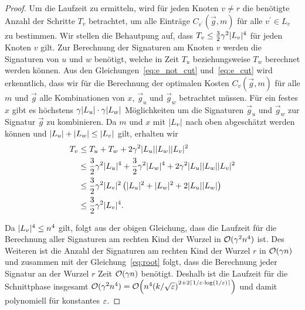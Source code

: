 \begin{proof}
    Um die Laufzeit zu ermitteln, wird für jeden Knoten $v \neq r$ die benötigte Anzahl der Schritte $T_v$ betrachtet, um alle Einträge $C_{v^\prime}(\vec{g}, m)$ für alle $v^\prime \in L_v$ zu bestimmen. 
    Wir stellen die Behautpung auf, dass $T_v \leq \frac{3}{2} \gamma^2 \lvert L_v\rvert^4$ für jeden Knoten $v$ gilt.
    Zur Berechnung der Signaturen am Knoten $v$ werden die Signaturen von $u$ und $w$ benötigt, welche in Zeit $T_u$ beziehungsweise $T_w$ berechnet werden können.
    Aus den Gleichungen~\eqref{eq:e_not_cut} und~\eqref{eq:e_cut} wird erkenntlich, dass wir für die Berechnung der optimalen Kosten $C_v(\vec{g}, m)$ für alle $m$ und $\vec{g}$ alle Kombinationen von $x$, $\vec{g}_u$ und $\vec{g}_w$ betrachtet müssen.
    Für ein festes $x$ gibt es höchstens $\gamma \lvert L_u\rvert \cdot \gamma \lvert L_w\rvert$ Möglichkeiten um die Signaturen $\vec{g}_u$ und $\vec{g}_w$ zur Signatur $\vec{g}$ zu kombinieren.
    Da $m$ und $x$ mit $\lvert L_v\rvert$ nach oben abgeschätzt werden können und $\lvert L_u\rvert + \lvert L_w\rvert \leq \lvert L_v\rvert$ gilt, erhalten wir
    \begin{equation*}
        \begin{aligned}
            T_v & \leq T_u + T_w + 2\gamma^2 \lvert L_u\rvert \lvert L_w\rvert \lvert L_v\rvert^2 \\
                & \leq \frac{3}{2} \gamma^2 \lvert L_u\rvert^4 + \frac{3}{2} \gamma^2 \lvert L_w\rvert^4 + 2\gamma^2 \lvert L_u\rvert \lvert L_w\rvert \lvert L_v\rvert^2 \\
                & \leq \frac{3}{2} \gamma^2 \lvert L_v\rvert^2 \left(\lvert L_u\rvert^2 + \lvert L_w\rvert^2 + 2 \lvert L_u\rvert \lvert L_w\rvert \right) \\
                & \leq \frac{3}{2} \gamma^2 \lvert L_v\rvert^4.
        \end{aligned}
    \end{equation*}

    Da $\lvert L_v\rvert^4 \leq n^4$ gilt, folgt aus der obigen Gleichung, dass die Laufzeit für die Berechnung aller Signaturen am rechten Kind der Wurzel in $\mathcal{O}(\gamma^2 n^4)$ ist.
    Des Weiteren ist die Anzahl der Signaturen am rechten Kind der Wurzel $r$ in $\mathcal{O}(\gamma n)$ und zusammen mit der Gleichung~\eqref{eq:root} folgt, dass die Berechnung jeder Signatur an der Wurzel $r$ Zeit $\mathcal{O}(\gamma n)$ benötigt.
    Deshalb ist die Laufzeit für die Schnittphase insgesamt $\mathcal{O}(\gamma^2 n^4) = \mathcal{O} \Big(n^4{(k/\sqrt{\varepsilon})}^{2+2 \lceil1/\varepsilon \cdot \log(1/\varepsilon)\rceil}\Big)$ und damit polynomiell für konstantes $\varepsilon$.
\end{proof}

